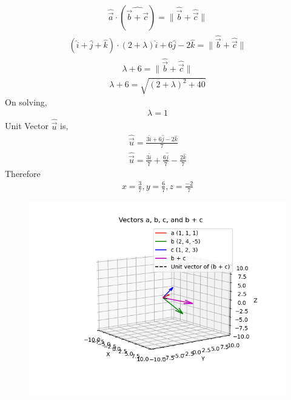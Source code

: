 \documentclass[journal]{IEEEtran}
\begin{document}
\begin{align}
    \hat{\vec{a}} \cdot (\hat{\vec{b}+\vec{c}})=\|\hat{\vec{b}}+\hat{\vec{c}}\|
\end{align}
\begin{align}
    (\hat{i}+\hat{j}+\hat{k}) \cdot (2+\lambda)\hat{i}+6\hat{j}-2\hat{k}=\|\hat{\vec{b}}+\hat{\vec{c}}\|
\end{align}
\begin{align}
    \lambda+6=\|\hat{\vec{b}}+\hat{\vec{c}}\|
\end{align}
\begin{align}
    \lambda+6=\sqrt{(2+\lambda)^2+40}
\end{align}
On solving,
\begin{align}
    \lambda=1
\end{align}
Unit Vector $\hat{\vec{u}}$ is,
\begin{align}
    \hat{\vec{u}}=\frac{3\hat{i}+6\hat{j}-2\hat{k}}{7}\\
     \hat{\vec{u}}=\frac{3\hat{i}}{7}+\frac{6\hat{j}}{7}-\frac{2\hat{k}}{7}
\end{align}
Therefore
\begin{align}
    x=\frac{3}{7},y=\frac{6}{7},z=\frac{-2}{7}
\end{align}
\begin{figure}[h!]
   \centering
   \includegraphics[width=\linewidth]{figs/Figure_1.png}
   \caption{}
   \label{stemplot}
\end{figure}
\end{document}
